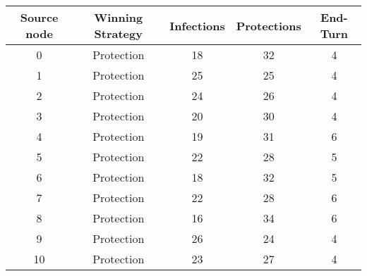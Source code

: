 \documentclass[results.tex]{subfiles}
\begin{document}
    \begin{center}
        \begin{tabular}{| c || c | c | c | c |}
            \hline
            {\bfseries Source node} & {\bfseries Winning Strategy} & {\bfseries Infections} & {\bfseries Protections}
            & {\bfseries End-Turn}
            \\  %
            \hline\hline
            0                       & Protection                   & 18                     & 32                      & 4                    \\
            \hline
            1                       & Protection                   & 25                     & 25                      & 4                    \\
            \hline
            2                       & Protection                   & 24                     & 26                      & 4                    \\
            \hline
            3                       & Protection                   & 20                     & 30                      & 4                    \\
            \hline
            4                       & Protection                   & 19                     & 31                      & 6                    \\
            \hline
            5                       & Protection                   & 22                     & 28                      & 5                    \\
            \hline
            6                       & Protection                   & 18                     & 32                      & 5                    \\
            \hline
            7                       & Protection                   & 22                     & 28                      & 6                    \\
            \hline
            8                       & Protection                   & 16                     & 34                      & 6                    \\
            \hline
            9                       & Protection                   & 26                     & 24                      & 4                    \\
            \hline
            10                      & Protection                   & 23                     & 27                      & 4                    \\

\end{tabular}
\end{center}
\end{document}
